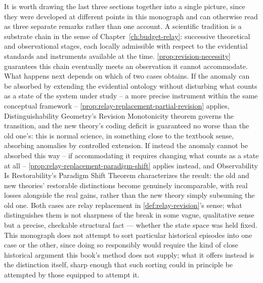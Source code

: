 It is worth drawing the last three sections together into a single
picture, since they were developed at different points in this
monograph and can otherwise read as three separate remarks rather than
one account. A scientific tradition is a substrate chain in the sense of
Chapter~\ref{ch:budget-relay}: successive theoretical and observational
stages, each locally admissible with respect to the evidential standards
and instruments available at the time. \cref{prop:revision-necessity}
guarantees this chain eventually meets an observation it cannot
accommodate. What happens next depends on which of two cases obtains.
If the anomaly can be absorbed by extending the evidential ontology
without disturbing what counts as a state of the system under study --
a more precise instrument within the same conceptual framework --
\cref{prop:relay-replacement-partial-revision} applies, Distinguishability
Geometry's Revision Monotonicity theorem governs the transition, and the
new theory's coding deficit is guaranteed no worse than the old one's:
this is normal science, in something close to the textbook sense,
absorbing anomalies by controlled extension. If instead the anomaly
cannot be absorbed this way -- if accommodating it requires changing
what counts as a state at all -- \cref{prop:relay-replacement-paradigm-shift}
applies instead, and Observability Is Restorability's Paradigm Shift
Theorem characterizes the result: the old and new theories' restorable
distinctions become genuinely incomparable, with real losses alongside
the real gains, rather than the new theory simply subsuming the old one.
Both cases are relay replacement in \cref{def:relay-revision}'s sense;
what distinguishes them is not sharpness of the break in some vague,
qualitative sense but a precise, checkable structural fact --- whether
the state space was held fixed. This monograph does not attempt to sort
particular historical episodes into one case or the other, since doing
so responsibly would require the kind of close historical argument this
book's method does not supply; what it offers instead is the distinction
itself, sharp enough that such sorting could in principle be attempted
by those equipped to attempt it.
